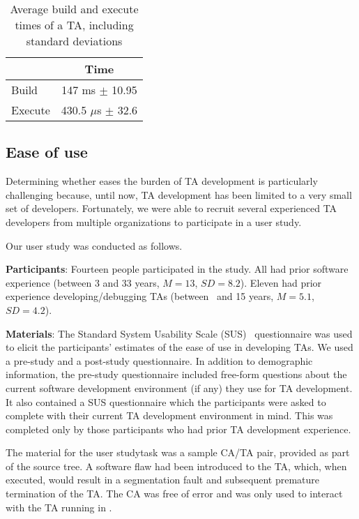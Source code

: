 \documentclass[10pt,conference,letterpaper]{IEEEtran}
\newif\ifabridged
\newif\ifnotabridged
\newcommand{\opentee}{\protect{TEE-Vi}\xspace}
\newcommand{\opentee}{\protect{Open-TEE}\xspace}
\begin{document}
\begin{table}
\centering
\caption{Average build and execute times of a TA, including standard deviations}
\label{tab:performance}
\begin{tabular}{l c}
  & Time \\
  \hline
  Build & 147 ms $\pm$ 10.95 \\
  \rowcolor{black!15} \cellcolor{black!15}Execute & 430.5 $\mu$s $\pm$ 32.6 \\
\hline
\end{tabular}
\end{table}
 \subsection{Ease of use}
\label{user-study}

Determining whether \opentee eases the burden of TA development is particularly
challenging because, until now, TA development has been limited to a very small
set of developers. Fortunately, we were able to recruit several experienced TA
developers from multiple organizations to participate in a user
study.
\ifabridged
Fourteen people participated in the study. Eleven had prior experience
developing/debugging TAs. We used a pre-study and a post-study
Standard System Usability Scale
(SUS)~\cite{bookchapter:sus,jour:BKM08} questionnaire to
elicit the participants' estimates of the ease of use in developing
TAs. They were asked to complete the pre-study SUS questionnaire with
their current TA software development environment in mind and the
post-study SUS questionnaire with \opentee in mind.
See the full version of this paper~\cite{MDNA15} for a complete
description of the user study.
\else
Our user study was conducted as follows.

\noindent\textbf{Participants}: Fourteen people participated in the
study. All had prior software experience (between 3 and 33 years,
$M=13$, $SD=8.2$). Eleven had prior experience developing/debugging
TAs (between \textonehalf\ and 15 years, $M = 5.1$, $SD = 4.2$).

\noindent\textbf{Materials}: The Standard System Usability Scale
(SUS)~\cite{bookchapter:sus,jour:BKM08} questionnaire was used to
elicit the participants' estimates of the ease of use in developing
TAs. We used a pre-study and a post-study questionnaire. In addition
to demographic information, the pre-study questionnaire included
free-form questions about the current software development environment
(if any) they use for TA development.  It also contained a SUS
questionnaire which the participants were asked to complete with their
current TA development environment in mind. This was completed only
by those participants who had prior TA development experience.
\fi
The material for the user study\footnotemark task was a sample CA/TA
pair, provided as part of the \opentee source tree. A software flaw
had been introduced to the TA, which, when executed, would result in a
segmentation fault and subsequent premature termination of the TA. The
CA was free of error and was only used to interact with the TA running
in \opentee.
\ifnotabridged
Code complexity metrics for the TA used in the user study are shown in
Table~\ref{tbl:user-study-ta-metrics}.
\fi
\end{document}
